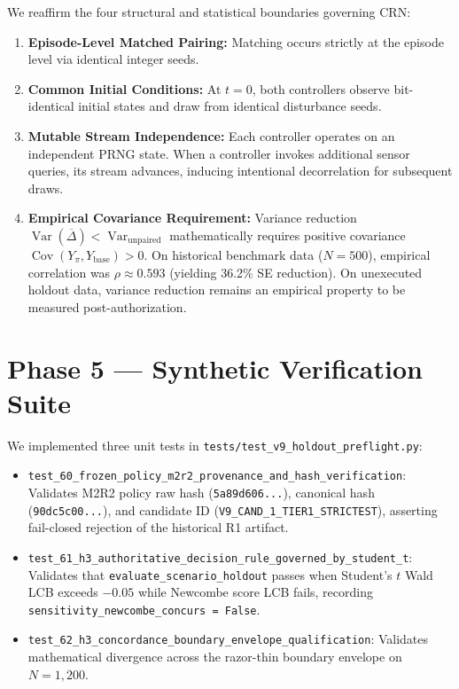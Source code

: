 \documentclass[10pt,a4paper]{article}
\begin{document}
We reaffirm the four structural and statistical boundaries governing CRN:
\begin{enumerate}
    \item \textbf{Episode-Level Matched Pairing:} Matching occurs strictly at the episode level via identical integer seeds.
    \item \textbf{Common Initial Conditions:} At $t = 0$, both controllers observe bit-identical initial states and draw from identical disturbance seeds.
    \item \textbf{Mutable Stream Independence:} Each controller operates on an independent PRNG state. When a controller invokes additional sensor queries, its stream advances, inducing intentional decorrelation for subsequent draws.
    \item \textbf{Empirical Covariance Requirement:} Variance reduction $\operatorname{Var}(\overline{\Delta}) < \operatorname{Var}_{\text{unpaired}}$ mathematically requires positive covariance $\operatorname{Cov}(Y_\pi, Y_{\text{base}}) > 0$. On historical benchmark data ($N = 500$), empirical correlation was $\rho \approx 0.593$ (yielding 36.2\% SE reduction). On unexecuted holdout data, variance reduction remains an empirical property to be measured post-authorization.
\end{enumerate}

\section{Phase 5 --- Synthetic Verification Suite}

We implemented three unit tests in \texttt{tests/test\_v9\_holdout\_preflight.py}:
\begin{itemize}
    \item \texttt{test\_60\_frozen\_policy\_m2r2\_provenance\_and\_hash\_verification}: Validates M2R2 policy raw hash (\texttt{5a89d606...}), canonical hash (\texttt{90dc5c00...}), and candidate ID (\texttt{V9\_CAND\_1\_TIER1\_STRICTEST}), asserting fail-closed rejection of the historical R1 artifact.
    \item \texttt{test\_61\_h3\_authoritative\_decision\_rule\_governed\_by\_student\_t}: Validates that \texttt{evaluate\_scenario\_holdout} passes when Student's $t$ Wald LCB exceeds $-0.05$ while Newcombe score LCB fails, recording \texttt{sensitivity\_newcombe\_concurs = False}.
    \item \texttt{test\_62\_h3\_concordance\_boundary\_envelope\_qualification}: Validates mathematical divergence across the razor-thin boundary envelope on $N = 1,200$.
\end{itemize}
\end{document}
